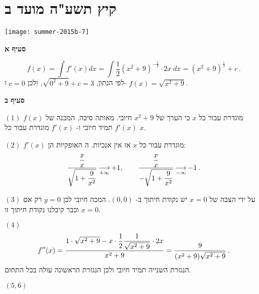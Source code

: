 \np


\section{קיץ תשע"ה מועד ב}

\begin{center}
\texttt{[image: summer-2015b-7]}
\end{center}

\vspace{-2ex}

\textbf{סעיף א}

\[
f(x)=\int f'(x) dx = \int \frac{1}{2}(x^2+9)^{-\frac{1}{2}}\cdot 2x\: dx = (x^2+9)^{\frac{1}{2}} +c\,.
\]
לפי הנתון,
$\sqrt{0^2+9}+c=3$,
ולכן
$c=0$
ו-%
$f(x) = \sqrt{x^2+9}$.

\textbf{סעיף ב}

$(1)$
$f(x)$
מוגדרת עבור כל
$x$
כי הערך של
$x^2+9$
חיובי. מאותה סיבה, המכנה של
$f'(x)$
תמיד חיובי ו-%
$f'(x)$
מוגדרת עבור כל 
$x$.


$(2)$
$f'(x)$
מוגדרת עבור כל 
$x$
אז אין
\asms{}
אנכיות. ה%
\asms{}
האופקיות הן:
\[
\frac{\displaystyle\frac{x}{x}}{\sqrt{1+\displaystyle\frac{9}{x^2}}}\mathop{\longrightarrow}\limits_{+\infty}+1,\quad\quad
\frac{\displaystyle\frac{x}{x}}{-\sqrt{1+\displaystyle\frac{9}{x^2}}}\mathop{\longrightarrow}\limits_{-\infty}-1\,.
\]

\np

$(3)$
על ידי הצבה של
$x=0$
יש נקודת חיתוך ב-%
$(0,0)$.
המכה חיובי לכן 
$y=0$
רק אם 
$x=0$
וכבר קיבלנו נקודת חיתוך זו.

$(4)$
\[
f''(x)= \frac{1\cdot\sqrt{x^2+9}- x\cdot \displaystyle\frac{1}{2} \displaystyle\frac{1}{\sqrt{x^2+9}}\cdot 2x}{x^2+9}=\frac{9}{(x^2+9)\sqrt{x^2+9}}\,.
\]
הנגזרת השנייה תמיד חיובי ולכן הנגזרת הראשונה עולה בכל התחום.

$(5,6)$

\begin{center}
\end{center}


